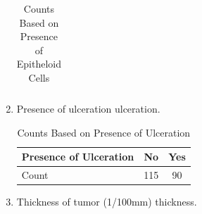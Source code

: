 \begin{enumerate}
\begin{table}[h!]
\begin{tabular}{|l|c|c|}
        \hline
    \end{tabular}
    \caption{Counts Based on Presence of Epitheloid Cells}
    \label{tab:epitheloid_cells}
\end{table}
\item Presence of ulceration ulceration. \newline
\begin{table}[h!]
    \centering
    \begin{tabular}{|l|c|c|}
        \hline
        Presence of Ulceration & No & Yes \\
        \hline
        Count & 115 & 90 \\
        \hline
    \end{tabular}
    \caption{Counts Based on Presence of Ulceration}
    \label{tab:ulceration}
\end{table}

\newpage
\item Thickness of tumor (1/100mm) thickness.


\end{enumerate}
